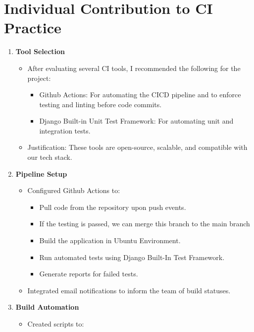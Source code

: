 \documentclass[a4paper,12pt]{article}
\begin{document}
\section{Individual Contribution to CI Practice}
\begin{enumerate}
    \item \textbf{Tool Selection}
        \begin{itemize}
            \item After evaluating several CI tools, I recommended the following for the project:
                \begin{itemize}
                    \item Github Actions: For automating the CICD pipeline and to enforce testing and linting before code commits.
                    \item Django Built-in Unit Test Framework: For automating unit and integration tests.
                \end{itemize}
            \item Justification: These tools are open-source, scalable, and compatible with our tech stack.
        \end{itemize}
    \item \textbf{Pipeline Setup}
        \begin{itemize}
            \item Configured Github Actions to:
                \begin{itemize}
                    \item Pull code from the repository upon push events.
                    \item If the testing is passed, we can merge this branch to the main branch
                    \item Build the application in Ubuntu Environment.
                    \item Run automated tests using Django Built-In Test Framework.
                    \item Generate reports for failed tests.
    \end{itemize}
    \item Integrated email notifications to inform the team of build statuses.
\end{itemize}
\item \textbf{Build Automation}
    \begin{itemize}
        \item Created scripts to:
            \begin{itemize}

\end{itemize}
\end{itemize}
\end{enumerate}
\end{document}
